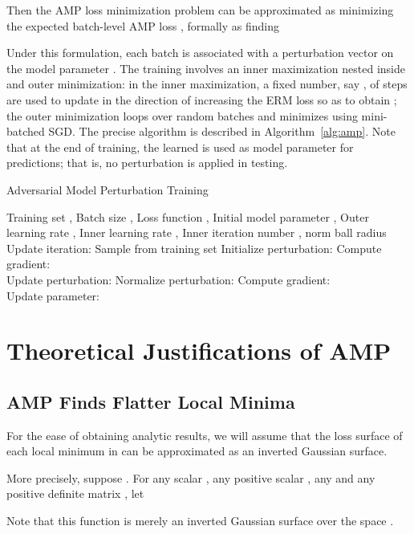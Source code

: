 \documentclass[final]{cvpr}
\begin{document}
Then the AMP loss minimization problem can be approximated as minimizing the expected batch-level AMP loss , formally as finding


Under this formulation, each batch  is associated with a perturbation vector  on the model parameter . The training involves an inner maximization nested inside and outer minimization: in the inner maximization, a fixed number, say , of steps are used to update  in the direction of increasing the ERM loss  so as to obtain ; the outer minimization loops over random batches and minimizes  using mini-batched SGD. The precise algorithm is described in Algorithm~\ref{alg:amp}. Note that at the end of training, the learned  is used as model parameter for predictions; that is, no perturbation is applied in testing.

\begin{algorithm}[!htbp]
\caption{Adversarial Model Perturbation Training}
\label{alg:amp}
\begin{algorithmic}[1]
\REQUIRE Training set , Batch size , Loss function , Initial model parameter , Outer learning rate , Inner learning rate , Inner iteration number ,  norm ball radius 
\STATE Update iteration: 
\STATE Sample  from training set 
\STATE Initialize perturbation: 
\FOR{}
\STATE Compute gradient: \\ 
\STATE Update perturbation: 
\IF{}
\STATE Normalize perturbation: 
\ENDIF
\ENDFOR
\STATE Compute gradient: \\ 
\STATE Update parameter: 
\ENDWHILE
\end{algorithmic}
\end{algorithm}

\section{Theoretical Justifications of AMP}\label{sec:just}

\subsection{AMP Finds Flatter Local Minima}

For the ease of obtaining analytic results, we will assume that
the loss surface of each local minimum in  can be approximated as an inverted Gaussian surface. 

More precisely, suppose . For any scalar , any positive scalar , any  and any  positive definite matrix , let


Note that this function is merely an inverted Gaussian surface over the space . 
\end{document}
